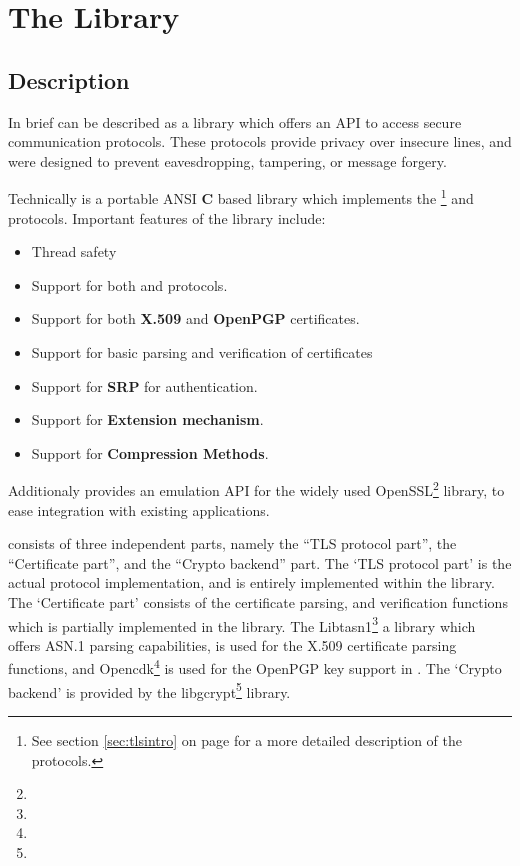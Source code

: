 \chapter{The Library}

\section{Description}
\par
In brief \gnutls{} can be described as a library which offers
an API to access secure communication protocols. These protocols provide
privacy over insecure lines, and were designed to prevent 
eavesdropping, tampering, or message forgery.

\par
Technically \gnutls{} is a portable ANSI {\bf C} based library which implements the 
\tlsI{}\footnote{See section \ref{sec:tlsintro} on page \pageref{sec:tlsintro} for
a more detailed description of the protocols.} and \sslIII{} protocols. 
Important features of the \gnutls{} library include:

\begin{itemize}
\item Thread safety
\item Support for both \tlsI{} and \sslIII{} protocols.
\item Support for both {\bf X.509} and {\bf OpenPGP} certificates.
\item Support for basic parsing and verification of certificates
\item Support for {\bf SRP} for \tls{} authentication.
\item Support for \tls{} {\bf Extension mechanism}.
\item Support for \tls{} {\bf Compression Methods}.
\end{itemize}

Additionaly \gnutls{} provides an emulation API for the widely used
OpenSSL\footnote{} 
library, to ease integration with existing applications.

\par 
\gnutls{} consists of three
independent parts, namely the ``TLS protocol part'', the ``Certificate part'', and 
the ``Crypto backend'' part.
The `TLS protocol part' is the actual protocol implementation, and is entirely
implemented within the \gnutls{} library.
The `Certificate part' consists of the certificate parsing, and verification
functions which is partially implemented in the \gnutls{} library. The
Libtasn1\footnote{}
a library which offers ASN.1 parsing capabilities, is used for the
X.509 certificate parsing functions, and
Opencdk\footnote{}
is used for the OpenPGP key support in \gnutls{}.
The `Crypto backend' is provided by the 
libgcrypt\footnote{}
library. 

